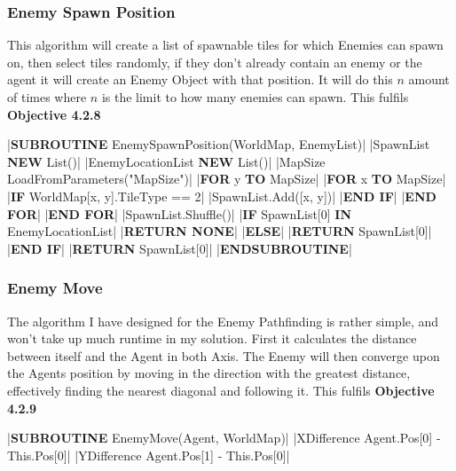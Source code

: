 \begin{flushleft}
                \vspace{0.5cm}
            \subsubsection{Enemy Spawn Position}
                This algorithm will create a list of spawnable tiles for which Enemies can spawn on, then select tiles randomly, if they don't
                already contain an enemy or the agent it will create an Enemy Object with that position. It will do this $n$ amount of times 
                where $n$ is the limit to how many enemies can spawn. This fulfils \textbf{Objective 4.2.8}
                
                \vspace{0.2cm}
                \begin{pseudocode}
|\textbf{SUBROUTINE} EnemySpawnPosition(WorldMap, EnemyList)|
    |SpawnList \leftarrow \textbf{NEW} List()|
    |EnemyLocationList \leftarrow \textbf{NEW} List()|
    |MapSize \leftarrow LoadFromParameters("MapSize")|
    |\textbf{FOR} y  \textbf{TO} MapSize|
        |\textbf{FOR} x  \textbf{TO} MapSize|
            |\textbf{IF} WorldMap[x, y].TileType == 2|
                |SpawnList.Add([x, y])|
            |\textbf{END IF}|
        |\textbf{END FOR}|
    |\textbf{END FOR}|
    |SpawnList.Shuffle()|
    |\textbf{IF} SpawnList[0] \textbf{IN} EnemyLocationList|
        |\textbf{RETURN NONE}|
    |\textbf{ELSE}|
        |\textbf{RETURN} SpawnList[0]|
    |\textbf{END IF}|
    |\textbf{RETURN} SpawnList[0]|
|\textbf{ENDSUBROUTINE}|
                \end{pseudocode}

                \vspace{0.5cm}
            \subsubsection{Enemy Move}
                The algorithm I have designed for the Enemy Pathfinding is rather simple, and won't take up much runtime in my solution.
                First it calculates the distance between itself and the Agent in both Axis. The Enemy will then converge upon the Agents
                position by moving in the direction with the greatest distance, effectively finding the nearest diagonal and following it.
                This fulfils \textbf{Objective 4.2.9}

                \vspace{0.2cm}
                \begin{pseudocode}
|\textbf{SUBROUTINE} EnemyMove(Agent, WorldMap)|
    |XDifference \leftarrow Agent.Pos[0] - This.Pos[0]|
    |YDifference \leftarrow Agent.Pos[1] - This.Pos[0]|


\end{pseudocode}
\end{flushleft}
